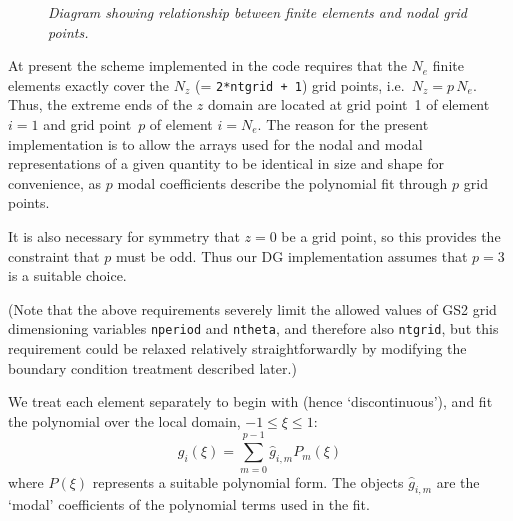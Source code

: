 \documentclass[10pt,a4paper]{article}
\begin{document}
\begin{figure}[ht]
  \begin{center}
  \end{center}
  \caption{\textit{Diagram showing relationship between finite elements
      and nodal grid points.}
    \label{fig:elements} }
\end{figure}

At present the scheme implemented in the code requires that the $N_e$ finite
elements exactly cover the $N_z$ (= \texttt{2*ntgrid + 1}) grid points, i.e.\
$N_z = p\, N_e$. Thus, the extreme ends of the $z$ domain are located at grid
point~1 of element $i=1$ and grid point~$p$ of element $i=N_e$. The reason for
the present implementation is to allow the arrays used for the nodal and modal
representations of a given quantity to be identical in size and shape for
convenience, as $p$ modal coefficients describe the polynomial fit through $p$
grid points.

It is also necessary for symmetry that $z=0$ be a grid point, so this provides
the constraint that $p$ must be odd. Thus our DG implementation assumes that
$p=3$ is a suitable choice.

(Note that the above requirements severely limit the allowed values of GS2
grid dimensioning variables \texttt{nperiod} and \texttt{ntheta}, and
therefore also \texttt{ntgrid}, but this requirement could be relaxed
relatively straightforwardly by modifying the boundary condition treatment
described later.)


We treat each element separately to begin with (hence `discontinuous'), and
fit the polynomial over the local domain, $-1 \leq \xi \leq 1$:
\[
g_i(\xi) = \sum_{m=0}^{p-1} \hat{g}_{i,m} P_m(\xi)
\]
where $P(\xi)$ represents a suitable polynomial form. The objects
$\hat{g}_{i,m}$ are the `modal' coefficients of the polynomial terms used in
the fit.
\end{document}
